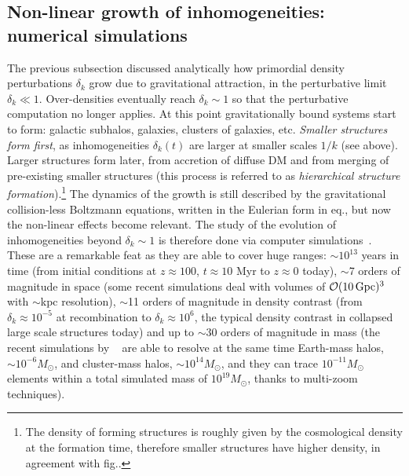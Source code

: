 \subsection{Non-linear growth of inhomogeneities: numerical simulations}\label{Nbody}
The previous subsection discussed analytically 
how primordial density perturbations $\delta_k $ grow due to gravitational attraction, 
in the perturbative limit $\delta_k\ll 1$. 
Over-densities eventually reach $\delta_k \sim 1$ so that the perturbative computation no longer applies. 
At this point gravitationally bound systems start to form: galactic subhalos, galaxies, clusters of galaxies, etc.
{\em Smaller structures form first}, 
as inhomogeneities $\delta_k (t)$ are larger at smaller scales $1/k$ (see above). Larger structures form later, from accretion of diffuse DM and from merging of pre-existing smaller structures (this process is referred to as {\em hierarchical structure formation}).\footnote{The density of forming structures is roughly given by the cosmological density at the formation time, therefore smaller structures have higher density, in agreement with fig..} 
The dynamics of the growth is still described by the gravitational collision-less Boltzmann equations, written in the Eulerian form in eq., but now the non-linear effects become relevant. 
The study of the evolution of inhomogeneities beyond $\delta_k\sim1$ is therefore done via computer simulations~\cite{Nbody}. 
These are a remarkable feat as they are able to cover huge ranges: $\sim$$10^{13}$ years in time (from initial conditions at $z \approx 100$, $t\approx 10$ Myr to $z\approx0$ today), $\sim$7 orders of magnitude in space (some recent simulations deal with volumes of $\mathcal{O}(10 \,{\rm Gpc})^3$ with $\sim$kpc resolution), $\sim$11 orders of magnitude in density contrast (from $\delta_k \approx 10^{-5}$ at recombination to $\delta_k \approx 10^{6}$, the typical density contrast in collapsed large scale structures today) and up to $\sim$30 orders of magnitude in mass (the recent simulations by ~\cite{Nbody} are able to resolve at the same time Earth-mass halos, $\sim10^{-6}M_\odot$, and cluster-mass halos, $\sim10^{14}M_\odot$, and they can trace $10^{-11}M_\odot$ elements within a total simulated mass of $10^{19}M_\odot$, thanks to multi-zoom techniques).  
 
